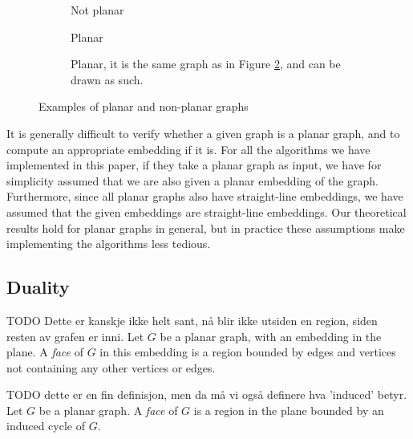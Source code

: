 \begin{figure}
    \centering
    \begin{subfigure}{.3\textwidth}
        \centering
        
        \caption{Not planar}
        \label{k33}
    \end{subfigure}%
    \begin{subfigure}{.3\textwidth}
        \centering
        
        \caption{Planar}
        \label{k4-a}
    \end{subfigure}%
    \begin{subfigure}{.3\textwidth}
        \centering
        
        \caption{Planar, it is the same graph as in Figure \ref{k4-a}, and can be drawn as such.}
        \label{k4-b}
    \end{subfigure}
    \caption{Examples of planar and non-planar graphs}
\end{figure}

It is generally difficult to verify whether a given graph is a planar graph, and to compute an appropriate embedding if it is. For all the algorithms we have implemented in this paper, if they take a planar graph as input, we have for simplicity assumed that we are also given a planar embedding of the graph. Furthermore, since all planar graphs also have straight-line embeddings, we have assumed that the given embeddings are straight-line embeddings. Our theoretical results hold for planar graphs in general, but in practice these assumptions make implementing the algorithms less tedious.

\subsection{Duality}
\begin{definition}[Face]
    TODO Dette er kanskje ikke helt sant, nå blir ikke utsiden en region, siden resten av grafen er inni.
    Let $G$ be a planar graph, with an embedding in the plane. A \emph{face} of $G$ in this embedding is a region bounded by edges and vertices not containing any other vertices or edges.
    
    TODO dette er en fin definisjon, men da må vi også definere hva 'induced' betyr.
    Let $G$ be a planar graph. A \emph{face} of $G$ is a region in the plane bounded by an induced cycle of $G$.
\end{definition}

